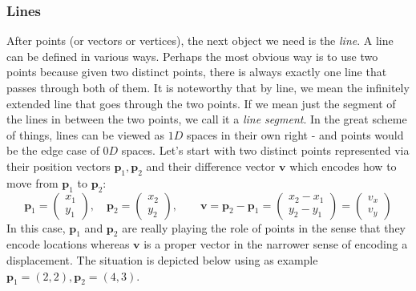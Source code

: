 \subsubsection{Lines}
After points (or vectors or vertices), the next object we need is the \emph{line}. A line can be defined in various ways. Perhaps the most obvious way is to use two points because given two distinct points, there is always exactly one line that passes through both of them. It is noteworthy that by line, we mean the infinitely extended line that goes through the two points. If we mean just the segment of the lines in between the two points, we call it a \emph{line segment}. In the great scheme of things, lines can be viewed as $1D$ spaces in their own right - and points would be the edge case of $0D$ spaces. Let's start with two distinct points represented via their position vectors $\mathbf{p}_1, \mathbf{p}_2$ and their difference vector $\mathbf{v}$ which encodes how to move from $\mathbf{p}_1$ to $\mathbf{p}_2$:
\begin{equation}
\mathbf{p}_1 = \begin{pmatrix} x_1 \\ y_1 \end{pmatrix}, \quad
\mathbf{p}_2 = \begin{pmatrix} x_2 \\ y_2 \end{pmatrix}, \qquad
\mathbf{v}   = \mathbf{p}_2 - \mathbf{p}_1 
             = \begin{pmatrix} x_2 - x_1 \\ y_2 - y_1 \end{pmatrix}
             = \begin{pmatrix} v_x \\ v_y \end{pmatrix}
\end{equation}
In this case, $\mathbf{p}_1$ and $\mathbf{p}_2$ are really playing the role of points in the sense that they encode locations whereas $\mathbf{v}$ is a proper vector in the narrower sense of encoding a displacement. The situation is depicted below using as example $\mathbf{p}_1 = (2,2), \mathbf{p}_2 = (4,3)$.


